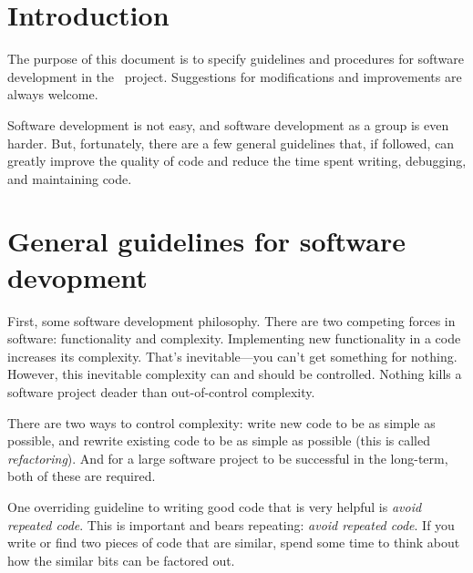 \documentclass{book}
\begin{document}

\tableofcontents

\chapter{Introduction} \label{s:intro}

The purpose of this document is to specify guidelines and procedures
for software development in the \cello\ project.  Suggestions for
modifications and improvements are always welcome.

Software development is not easy, and software development as a group
is even harder.  But, fortunately, there are a few general guidelines
that, if followed, can greatly improve the quality of code and reduce
the time spent writing, debugging, and maintaining code.

\chapter{General guidelines for software devopment}

First, some software development philosophy.  There are two competing
forces in software: functionality and complexity.  Implementing new
functionality in a code increases its complexity.  That's
inevitable---you can't get something for nothing.  However, this
inevitable complexity can and should be controlled.  Nothing kills a
software project deader than out-of-control complexity.

There are two ways to control complexity: write new code to be as
simple as possible, and rewrite existing code to be as simple as
possible (this is called \textit{refactoring}).  And for a large
software project to be successful in the long-term, both of these are
required.

One overriding guideline to writing good code that is very helpful is
\textit{avoid repeated code}.  This is important and bears repeating:
\textit{avoid repeated code}.  If you write or find two pieces of
code that are similar, spend some time to think about how the similar
bits can be factored out.  
\end{document}

